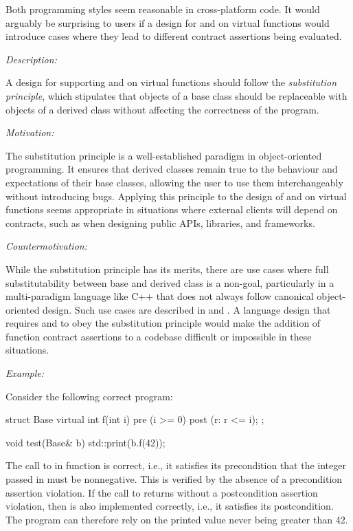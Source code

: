 Both programming styles seem reasonable in cross-platform code. It would arguably be surprising to users if a design for  and  on virtual functions would introduce cases where they lead to different contract assertions being evaluated.


\emph{Description:}

A design for supporting  and  on virtual functions should follow the \emph{substitution principle}, which stipulates that objects of a base class should be replaceable with objects of a derived class without affecting the correctness of the program.


\emph{Motivation:}

The substitution principle is a well-established paradigm in object-oriented programming. It ensures that derived classes remain true to the behaviour and expectations of their base classes, allowing the user to use them interchangeably without introducing bugs. Applying this principle to the design of  and  on virtual functions seems appropriate in situations where external clients will depend on contracts, such as when designing public APIs, libraries, and frameworks.

\emph{Countermotivation:}

While the substitution principle has its merits, there are use cases where full substitutability between base and derived class is a non-goal, particularly in a multi-paradigm language like C++ that does not always follow canonical object-oriented design. Such use cases are described in  and . A language design that requires  and  to obey the substitution principle would make the addition of function contract assertions to a codebase difficult or impossible in these situations.

\emph{Example:}

Consider the following correct program:
\begin{codeblock}
struct Base {
  virtual int f(int i)
    pre (i >= 0)
    post (r: r <= i);
};

void test(Base& b) {
  std::print(b.f(42));
}
\end{codeblock}
The call to  in function  is correct, i.e., it satisfies its precondition that the integer passed in must be nonnegative. This is verified by the absence of a precondition assertion violation. If the call to  returns without a postcondition assertion violation, then  is also implemented correctly, i.e., it satisfies its postcondition. The program can therefore rely on  the printed value never being greater than 42.

